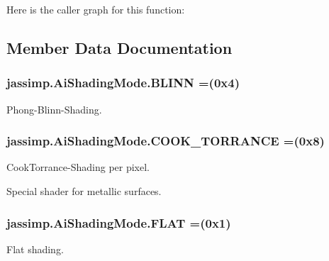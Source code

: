 Here is the caller graph for this function\+:




\subsection{Member Data Documentation}
\hypertarget{enumjassimp_1_1_ai_shading_mode_a5c9f9ee60553aecc6fdea58cd3c28376}{
\subsubsection[{B\+L\+I\+N\+N}]{\setlength{\rightskip}{0pt plus 5cm}jassimp.\+Ai\+Shading\+Mode.\+B\+L\+I\+N\+N =(0x4)}}\label{enumjassimp_1_1_ai_shading_mode_a5c9f9ee60553aecc6fdea58cd3c28376}
Phong-\/\+Blinn-\/\+Shading. \hypertarget{enumjassimp_1_1_ai_shading_mode_a103698684afbe1f51528df8e27ed2306}{
\subsubsection[{C\+O\+O\+K\+\_\+\+T\+O\+R\+R\+A\+N\+C\+E}]{\setlength{\rightskip}{0pt plus 5cm}jassimp.\+Ai\+Shading\+Mode.\+C\+O\+O\+K\+\_\+\+T\+O\+R\+R\+A\+N\+C\+E =(0x8)}}\label{enumjassimp_1_1_ai_shading_mode_a103698684afbe1f51528df8e27ed2306}
Cook\+Torrance-\/\+Shading per pixel.

Special shader for metallic surfaces. \hypertarget{enumjassimp_1_1_ai_shading_mode_a9dbf2a91f6777baf52d04113a2835b6e}{
\subsubsection[{F\+L\+A\+T}]{\setlength{\rightskip}{0pt plus 5cm}jassimp.\+Ai\+Shading\+Mode.\+F\+L\+A\+T =(0x1)}}\label{enumjassimp_1_1_ai_shading_mode_a9dbf2a91f6777baf52d04113a2835b6e}
Flat shading.


